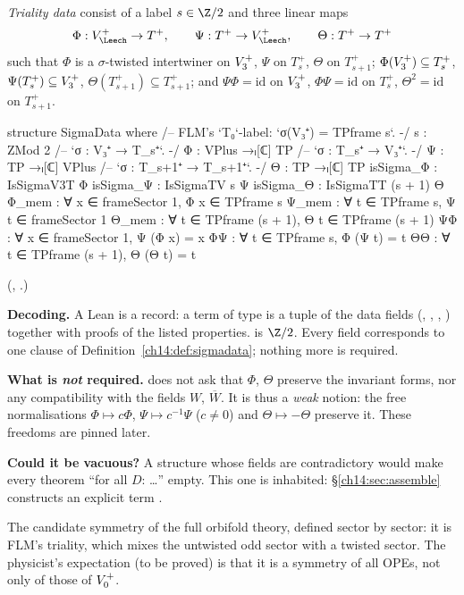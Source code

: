 \begin{definition}\label{ch14:def:sigmadata}
\emph{Triality data} consist of a label $s\in\Z/2$ and three linear maps
\begin{equation*}
  \Phi:V_\Leech^+\to T^+,\qquad \Psi:T^+\to V_\Leech^+,\qquad \Theta:T^+\to T^+
\end{equation*}
such that $\Phi$ is a $\sigma$-twisted intertwiner on $V_3^{+}$, $\Psi$ on $T_s^+$, $\Theta$ on
$T_{s+1}^+$; $\Phi(V_3^{+})\subseteq T_s^+$, $\Psi(T_s^+)\subseteq V_3^{+}$,
$\Theta(T_{s+1}^+)\subseteq T_{s+1}^+$; and $\Psi\Phi=\mathrm{id}$ on $V_3^{+}$, $\Phi\Psi=\mathrm{id}$
on $T_s^+$, $\Theta^2=\mathrm{id}$ on $T_{s+1}^+$.
\end{definition}
\begin{leancode}
structure SigmaData where
  /-- FLM's `T₀`-label: `σ(V₃⁺) = TPframe s`. -/
  s : ZMod 2
  /-- `σ : V₃⁺ → T_s⁺`. -/
  Φ : VPlus →ₗ[ℂ] TP
  /-- `σ : T_s⁺ → V₃⁺`. -/
  Ψ : TP →ₗ[ℂ] VPlus
  /-- `σ : T_{s+1}⁺ → T_{s+1}⁺`. -/
  Θ : TP →ₗ[ℂ] TP
  isSigma_Φ : IsSigmaV3T Φ
  isSigma_Ψ : IsSigmaTV s Ψ
  isSigma_Θ : IsSigmaTT (s + 1) Θ
  Φ_mem : ∀ x ∈ frameSector 1, Φ x ∈ TPframe s
  Ψ_mem : ∀ t ∈ TPframe s, Ψ t ∈ frameSector 1
  Θ_mem : ∀ t ∈ TPframe (s + 1), Θ t ∈ TPframe (s + 1)
  ΨΦ : ∀ x ∈ frameSector 1, Ψ (Φ x) = x
  ΦΨ : ∀ t ∈ TPframe s, Φ (Ψ t) = t
  ΘΘ : ∀ t ∈ TPframe (s + 1), Θ (Θ t) = t
\end{leancode}
(, .)

\begin{dictionary}
\textbf{Decoding.}  A Lean  is a record: a term of type  is a tuple
of the data fields (, , , ) together with proofs of the listed
properties.   is $\Z/2$.  Every field corresponds to one clause of
Definition~\ref{ch14:def:sigmadata}; nothing more is required.

\textbf{What is \emph{not} required.}   does not ask that $\Phi$, $\Theta$ preserve
the invariant forms, nor any compatibility with the fields $W$, $\overline W$.  It is thus a
\emph{weak} notion: the free normalisations $\Phi\mapsto c\Phi$, $\Psi\mapsto c^{-1}\Psi$ ($c\ne0$) and
$\Theta\mapsto-\Theta$ preserve it.  These freedoms are pinned later.

\textbf{Could it be vacuous?}  A structure whose fields are contradictory would make every theorem
``for all $D$: \ldots'' empty.  This one is inhabited: \S\ref{ch14:sec:assemble} constructs an
explicit term .
\end{dictionary}
\begin{physics}
The candidate symmetry of the full orbifold theory, defined sector by sector: it is FLM's triality, which mixes the untwisted odd sector with a twisted sector. The physicist's expectation (to be proved) is that it is a symmetry of all OPEs, not only of those of $V_0^{+}$.
\end{physics}


